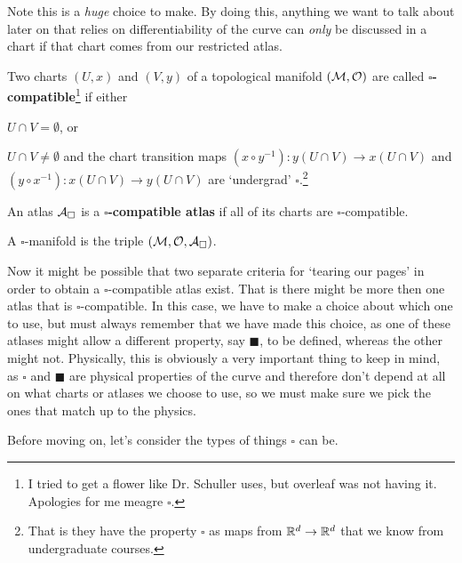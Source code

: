 Note this is a \textit{huge} choice to make. By doing this, anything we want to talk about later on that relies on differentiability of the curve can \textit{only} be discussed in a chart if that chart comes from our restricted atlas. 

    Two charts $(U,x)$ and $(V,y)$ of a topological manifold $(\mathcal{M},\mathcal{O})$ are called \textbf{$\square$-compatible}\footnote{I tried to get a flower like Dr. Schuller uses, but overleaf was not having it. Apologies for me meagre $\square$.} if either
    \ben[label=(\alph*)] 
        \item $U\cap V =\emptyset$, or 
        \item $U\cap V \neq \emptyset$ and the chart transition maps $(x\circ y^{-1}):y(U\cap V) \to x(U\cap V)$ and $(y\circ x^{-1}):x(U\cap V) \to y(U\cap V)$ are `undergrad' $\square$.\footnote{That is they have the property $\square$ as maps from $\mathbb{R}^d\to \mathbb{R}^d$ that we know from undergraduate courses.}
    \een 
\ed 

    An atlas $\mathcal{A}_{\square}$ is a \textbf{$\square$-compatible atlas} if all of its charts are $\square$-compatible.
\ed 

\bd[]
    A $\square$-manifold is the triple $(\mathcal{M},\mathcal{O},\mathcal{A}_{\square})$.
\ed 

Now it might be possible that two separate criteria for `tearing our pages' in order to obtain a $\square$-compatible atlas exist. That is there might be more then one atlas that is $\square$-compatible. In this case, we have to make a choice about which one to use, but must always remember that we have made this choice, as one of these atlases might allow a different property, say $\blacksquare$, to be defined, whereas the other might not. Physically, this is obviously a very important thing to keep in mind, as $\square$ and $\blacksquare$ are physical properties of the curve and therefore don't depend at all on what charts or atlases we choose to use, so we must make sure we pick the ones that match up to the physics. 

Before moving on, let's consider the types of things $\square$ can be. 

